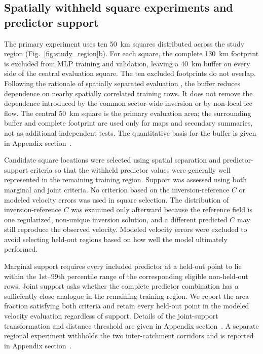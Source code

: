 \documentclass[review,jog]{igs}
\begin{document}
\subsection{Spatially withheld square experiments and predictor support}

The primary experiment uses ten 50~km squares distributed across the study
region (Fig.~\ref{fig:study_region}b). For each square, the complete 130~km
footprint is excluded from MLP training and validation, leaving a 40~km buffer
on every side of the central evaluation square. The ten excluded footprints do
not overlap. Following the rationale of spatially separated evaluation \citep{roberts2017crossvalidation,valavi2019blockcv}, the buffer reduces dependence on nearby spatially correlated training rows. It does not remove the
dependence introduced by the common sector-wide inversion or by non-local ice
flow. The central 50~km square is the primary evaluation area; the surrounding
buffer and complete footprint are used only for maps and secondary summaries,
not as additional independent tests. The quantitative basis for the buffer is
given in Appendix section~.

Candidate square locations were selected using spatial separation and
predictor-support criteria so that the withheld predictor values were generally
well represented in the remaining training region. Support was assessed using
both marginal and joint criteria. No criterion based on the inversion-reference $C$ or modeled velocity errors was used in square selection. The
distribution of inversion-reference $C$ was examined only afterward because the reference field is one regularized, non-unique inversion solution, and a different predicted $C$ may still reproduce the observed velocity.
Modeled velocity errors were excluded to avoid selecting held-out regions based on how well the model ultimately performed.

Marginal support requires every included predictor at a held-out point to lie
within the 1st--99th percentile range of the corresponding eligible non-held-out
rows. Joint support asks whether the complete predictor combination has a
sufficiently close analogue in the remaining training region. We report the area fraction satisfying both criteria and retain every held-out point in the modeled velocity evaluation regardless of support. Details of the joint-support
transformation and distance threshold are given in Appendix section~. A separate regional experiment withholds the two inter-catchment corridors and is reported in Appendix section~.
\end{document}

